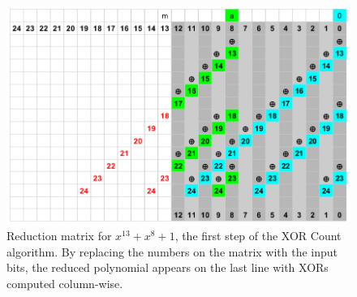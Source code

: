 \begin{figure}[htb]
  \centering
  \includegraphics[width=0.8\columnwidth]{figures/reduction_matrix.png}
\caption{Reduction matrix for $x^{13}+x^8+1$, the first step of the XOR Count algorithm. By replacing the numbers on the matrix with the input bits, the reduced polynomial appears on the last line with XORs computed column-wise.}
\label{fig:reduction_matrix}
\end{figure}
